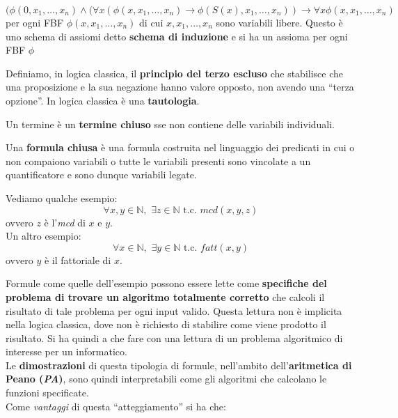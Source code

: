 \documentclass[a4paper,12pt, oneside]{book}
\begin{document}
\begin{shaded}
\begin{definizione}
    {\footnotesize{\[(\phi(0,x_1,\ldots,x_n)\land(\forall
      x(\phi(x,x_1,\ldots,x_n)\to\phi(S(x),x_1,\ldots,x_n))\to\forall 
      x\phi(x,x_1,\ldots,x_n)\]}}
    per ogni FBF $\phi(x,x_1,\ldots,x_n)$ di cui
    $x,x_1,\ldots,x_n$ sono variabili libere. Questo è uno schema di assiomi
    detto \textbf{schema di induzione} e si ha un assioma per ogni FBF
    $\phi$ 
  \end{definizione}
  \begin{definizione}
    Definiamo, in logica classica, il \textbf{principio del terzo escluso} che
    stabilisce che una proposizione e la sua negazione hanno valore opposto, non
    avendo una ``terza opzione''. In logica classica è una \textbf{tautologia}.
  \end{definizione}
  \begin{definizione}
    Un termine è un \textbf{termine chiuso} sse non contiene delle variabili
    individuali.  
  \end{definizione}
  \begin{definizione}
    Una \textbf{formula chiusa} è una formula costruita nel linguaggio dei
    predicati in cui o non compaiono variabili o tutte le variabili presenti
    sono vincolate a un quantificatore e sono dunque variabili legate. 
  \end{definizione}
\end{shaded}
\begin{esempio}
  Vediamo qualche esempio:
  \[\forall x,y\in\mathbb{N},\,\,\exists z\in\mathbb{N}\mbox{ t.c. }
    mcd(x,y,z)\]
  ovvero $z$ è l'\textit{mcd} di $x$ e $y$.\\
  Un altro esempio:
  \[\forall x\in \mathbb{N},\,\,\exists y\in \mathbb{N}\mbox{ t.c. }
    fatt(x,y)\]
  ovvero $y$ è il fattoriale di $x$.
\end{esempio}
Formule come quelle dell'esempio possono essere lette come \textbf{specifiche
  del problema di trovare un algoritmo totalmente corretto} che calcoli il
risultato di tale problema per ogni input valido. Questa lettura non è implicita
nella logica classica, dove non è richiesto di stabilire come viene prodotto il
risultato. Si ha quindi a che fare con una lettura di un problema algoritmico di
interesse per un informatico.\\
Le \textbf{dimostrazioni} di questa tipologia di formule, nell'ambito
dell'\textbf{aritmetica di Peano (\textit{PA})}, sono quindi interpretabili come
gli algoritmi che calcolano le funzioni specificate. \\
Come \textit{vantaggi} di questa ``atteggiamento'' si ha che:
\end{document}
